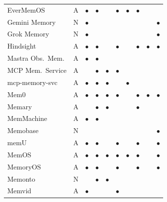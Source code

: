\begin{table}[!t]
\begin{tabular}{@{}lc cccccccc@{}}
EverMemOS            & A & $\bullet$ & $\bullet$ &           & $\bullet$ & $\bullet$ & $\bullet$ &           &           \\
Gemini Memory        & N & $\bullet$ &           &           &           &           &           &           & $\bullet$ \\
Grok Memory          & N & $\bullet$ &           &           &           &           &           &           & $\bullet$ \\
Hindsight            & A & $\bullet$ & $\bullet$ &           & $\bullet$ &           & $\bullet$ & $\bullet$ & $\bullet$ \\
Mastra Obs.\ Mem.    & A & $\bullet$ & $\bullet$ &           &           &           &           &           &           \\
MCP Mem.\ Service    & A &           & $\bullet$ & $\bullet$ & $\bullet$ &           &           &           &           \\
mcp-memory-svc        & A & $\bullet$ & $\bullet$ & $\bullet$ &           & $\bullet$ &           &           &           \\
Mem0                 & A & $\bullet$ & $\bullet$ & $\bullet$ & $\bullet$ &           & $\bullet$ & $\bullet$ & $\bullet$ \\
Memary               & A &           & $\bullet$ & $\bullet$ &           &           & $\bullet$ &           &           \\
MemMachine           & A & $\bullet$ & $\bullet$ &           &           &           &           &           &           \\
Memobase             & N &           &           &           &           &           &           &           & $\bullet$ \\
memU                 & A & $\bullet$ & $\bullet$ &           & $\bullet$ &           & $\bullet$ &           & $\bullet$ \\
MemOS                & A & $\bullet$ & $\bullet$ & $\bullet$ & $\bullet$ & $\bullet$ & $\bullet$ &           & $\bullet$ \\
MemoryOS             & A & $\bullet$ & $\bullet$ &           & $\bullet$ &           & $\bullet$ &           & $\bullet$ \\
Memonto              & N &           & $\bullet$ & $\bullet$ &           &           &           &           &           \\
Memvid               & A & $\bullet$ &           &           & $\bullet$ &           &           &           &           \\

\end{tabular}
\end{table}
